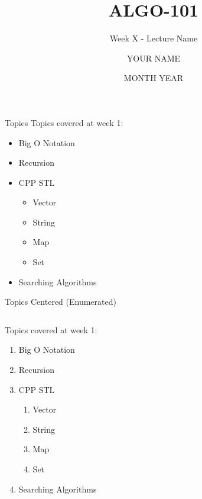 \documentclass[aspectratio=169]{beamer}%
\title{ALGO-101}%
\subtitle{Week X - Lecture Name}%
\author{YOUR NAME}%
\date{MONTH YEAR}%
\institute{ITU ACM}%
\begin{document}
%

\frame{\titlepage}%

\begin{frame}{Topics}
    Topics covered at week 1:
    \begin{itemize}%
        \item Big O Notation
        \item Recursion
        \item CPP STL
            \begin{itemize}%
                \item Vector
                \item String
                \item Map
                \item Set
            \end{itemize}%
        \item Searching Algorithms
    \end{itemize}%
\end{frame}%

\begin{frame}{Topics Centered (Enumerated)}%
    \begin{columns}[t]%
        \begin{column}{0.3\textwidth}%
            Topics covered at week 1:
            \begin{enumerate}%
                \item Big O Notation
                \item Recursion
                \item CPP STL
                    \begin{enumerate}%
                        \item Vector
                        \item String
                        \item Map
                        \item Set
                    \end{enumerate}%
                \item Searching Algorithms
            \end{enumerate}%
        \end{column}%
    \end{columns}%
\end{frame}%
\end{document}
